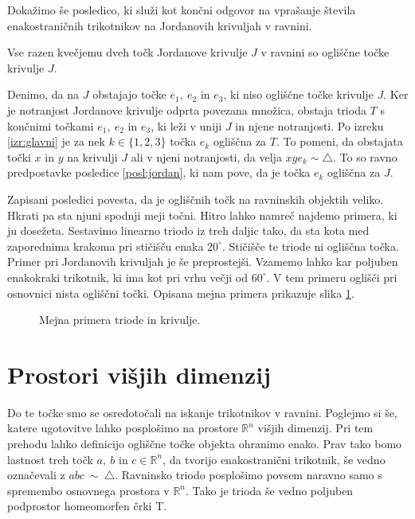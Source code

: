 \documentclass[mat1]{fmfdelo}
\newcommand{\R}{\mathbb R}
\begin{document}
Dokažimo še posledico, ki služi kot končni odgovor na vprašanje števila enakostraničnih trikotnikov na Jordanovih krivuljah v ravnini.
\begin{posledica}
Vse razen kvečjemu dveh točk Jordanove krivulje $J$ v ravnini so ogliščne točke krivulje $J$.
\end{posledica}
\proof
Denimo, da na $J$ obstajajo točke $e_1,\ e_2$ in $e_3$, ki niso ogliščne točke krivulje $J$. Ker je notranjost Jordanove krivulje odprta povezana množica, obstaja trioda $T$ s končnimi točkami $e_1,\ e_2$ in $e_3$, ki leži v uniji $J$ in njene notranjosti. Po izreku \ref{izr:glavni} je za nek $k \in \{1, 2, 3\}$ točka $e_k$ ogliščna za $T$. To pomeni, da obstajata točki $x$ in $y$ na krivulji $J$ ali v njeni notranjosti, da velja $xye_k \sim \triangle$. To so ravno predpostavke posledice \ref{posl:jordan}, ki nam pove, da je točka $e_k$ ogliščna za $J$.
\endproof

Zapisani posledici povesta, da je ogliščnih točk na ravninskih objektih veliko. Hkrati pa sta njuni spodnji meji točni. Hitro lahko namreč najdemo primera, ki ju dosežeta. Sestavimo linearno triodo iz treh daljic tako, da sta kota med zaporednima krakoma pri stičišču enaka $20^\circ$. Stičišče te triode ni ogliščna točka. Primer pri Jordanovih krivuljah je še preprostejši. Vzamemo lahko kar poljuben enakokraki trikotnik, ki ima kot pri vrhu večji od $60^\circ$. V tem primeru oglišči pri osnovnici nista ogliščni točki. Opisana mejna primera prikazuje slika \ref{fig:mejna_primera}.

\begin{figure}[h!]
\centering
{}
\caption{Mejna primera triode in krivulje.}
\label{fig:mejna_primera}
\end{figure}

\section{Prostori višjih dimenzij}
Do te točke smo se osredotočali na iskanje trikotnikov v ravnini. Poglejmo si še, katere ugotovitve lahko posplošimo na prostore $\R^n$ višjih dimenzij. Pri tem prehodu lahko definicijo ogliščne točke objekta ohranimo enako. Prav tako bomo lastnost treh točk $a,\ b$ in $c \in \R^n$, da tvorijo enakostranični trikotnik, še vedno označevali z $abc~\sim~\triangle$. Ravninsko triodo posplošimo povsem naravno samo s spremembo osnovnega prostora v $\R^n$. Tako je trioda še vedno poljuben podprostor homeomorfen črki T. 
\end{document}
